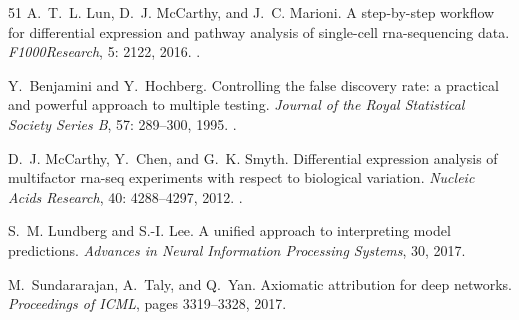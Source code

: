 \documentclass[10pt]{article}
\begin{document}
\begin{thebibliography}{51}
A.~T.~L. Lun, D.~J. McCarthy, and J.~C. Marioni.
\newblock A step-by-step workflow for differential expression and pathway
  analysis of single-cell rna-sequencing data.
\newblock \emph{F1000Research}, 5: 2122, 2016.
\newblock {}.

Y.~Benjamini and Y.~Hochberg.
\newblock Controlling the false discovery rate: a practical and powerful
  approach to multiple testing.
\newblock \emph{Journal of the Royal Statistical Society Series B},
  57: 289--300, 1995.
\newblock {}.

D.~J. McCarthy, Y.~Chen, and G.~K. Smyth.
\newblock Differential expression analysis of multifactor rna-seq experiments
  with respect to biological variation.
\newblock \emph{Nucleic Acids Research}, 40: 4288--4297, 2012.
\newblock {}.

S.~M. Lundberg and S.-I. Lee.
\newblock A unified approach to interpreting model predictions.
\newblock \emph{Advances in Neural Information Processing Systems}, 30, 2017.

M.~Sundararajan, A.~Taly, and Q.~Yan.
\newblock Axiomatic attribution for deep networks.
\newblock \emph{Proceedings of ICML}, pages 3319--3328, 2017.

\end{thebibliography}
\end{document}
